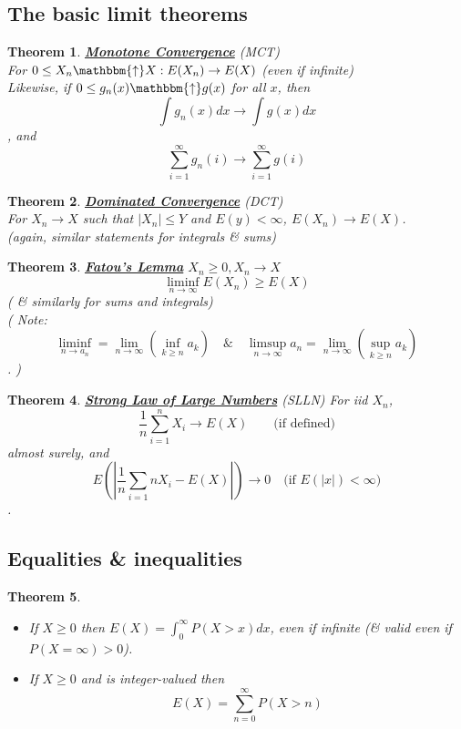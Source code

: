 \documentclass[12pt]{article}
\theoremstyle{definition}
\theoremstyle{plain}
\newtheorem{mythm}{Theorem}[section]
\begin{document}
\subsection*{The basic limit theorems}
\begin{mythm}
\underline{\textbf{Monotone Convergence}} (MCT) \\
For $0 \leq X_n \mathbbm{\uparrow} X : E(X_n) \rightarrow E(X)$ (even if infinite) \\
Likewise, if $0 \leq g_n(x) \mathbbm{\uparrow} g(x)$ for all $x$, then \[\int g_n(x) dx \rightarrow \int g(x) dx\], and \[\sum_{i=1}^\infty g_n(i) \rightarrow \sum_{i=1}^\infty g(i) \]
\end{mythm}
\begin{mythm}
\underline{\textbf{Dominated Convergence}} (DCT) \\
For $X_n \rightarrow X$ such that $|X_n| \leq Y$ and $E(y) < \infty$, $E(X_n) \rightarrow E(X)$.\\
(again, similar statements for integrals \& sums)
\end{mythm}
\begin{mythm}
\underline{\textbf{Fatou's Lemma}} $X_n \geq 0, X_n \rightarrow X$ \[ \liminf \limits_{n \rightarrow \infty} E(X_n) \geq E(X)\] ( \& similarly for sums and integrals)\\
( Note: \[\liminf \limits_{n \rightarrow a_n} = \lim \limits_{n \rightarrow \infty} (\underset{k \geq n}{\inf} a_k) \quad \& \quad \limsup \limits_{n \rightarrow \infty} a_n = \lim \limits_{n \rightarrow \infty} (\underset{k \geq n}{\sup} a_k)\]. )
\end{mythm}
\begin{mythm}
\underline{\textbf{Strong Law of Large Numbers}} (SLLN) For iid $X_n$, \[\frac{1}{n}\sum_{i=1}^n X_i \rightarrow E(X) \qquad \text{(if defined)}\] almost surely, and \[E(|\frac{1}{n}\sum_{i=1}{n}X_i - E(X)|) \rightarrow 0 \quad \text{(if $E(|x|) < \infty$})\].
\end{mythm}

\subsection*{Equalities \& inequalities}

\begin{mythm}
$\mbox{}$
\begin{itemize}
\item If $X \geq 0$ then $E(X) = \int_0^\infty P(X > x)dx$, even if infinite (\& valid even if $P(X=\infty)>0$). 
\item If $X \geq 0$ and is integer-valued then \[E(X) = \sum_{n=0}^{\infty}P(X > n)\]
\end{itemize}
\end{mythm}
\end{document}

